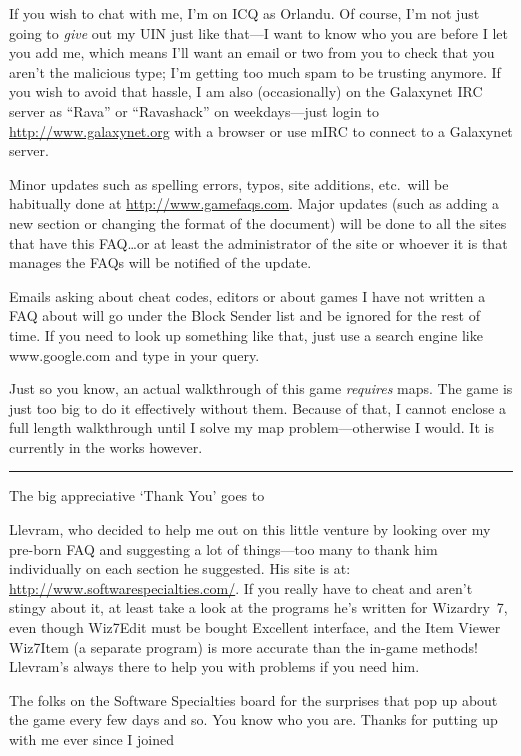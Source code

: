 \documentclass[10pt,twoside,openright]{report}
\begin{document}
If you wish to chat with me, I'm on ICQ as Orlandu. Of course, I'm not just
going to \emph{give} out my UIN just like that---I want to know who you are
before I let you add me, which means I'll want an email or two from you to
check that you aren't the malicious type; I'm getting too much spam to be
trusting anymore. If you wish to avoid that hassle, I am also (occasionally)
on the Galaxynet IRC server as ``Rava'' or ``Ravashack'' on weekdays---just
login to \url{http://www.galaxynet.org} with a browser or use mIRC to connect
to a Galaxynet server.

Minor updates such as spelling errors, typos, site additions, etc.\ will
be habitually done at \url{http://www.gamefaqs.com}. Major updates (such
as adding a new section or changing the format of the document) will be
done to all the sites that have this FAQ\ldots{}or at least the
administrator of the site or whoever it is that manages the FAQs will be
notified of the update.

Emails asking about cheat codes, editors or about games I have not
written a FAQ about will go under the Block Sender list and be ignored
for the rest of time. If you need to look up something like that, just
use a search engine like www.google.com and type in your query.

Just so you know, an actual walkthrough of this game \emph{requires}
maps. The game is just too big to do it effectively without them.
Because of that, I cannot enclose a full length walkthrough until I
solve my map problem---otherwise I would. It is currently in the works
however.

\begin{center}\rule{0.5\linewidth}{\linethickness}\end{center}

The big appreciative `Thank You' goes to

Llevram, who decided to help me out on this little venture by looking over my
pre-born FAQ and suggesting a lot of things---too many to thank him
individually on each section he suggested. His site is at:
\url{http://www.softwarespecialties.com/}. If you really have to cheat and
aren't stingy about it, at least take a look at the programs he's written for
Wizardry~7, even though Wiz7Edit must be bought Excellent interface, and the
Item Viewer Wiz7Item (a separate program) is more accurate than the in-game
methods! Llevram's always there to help you with problems if you need him.

The folks on the Software Specialties board for the surprises that pop
up about the game every few days and so. You know who you are. Thanks
for putting up with me ever since I joined
\end{document}
